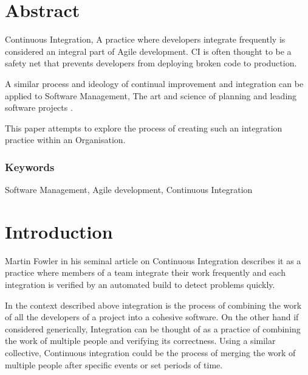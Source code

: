 \section*{Abstract}
Continuous Integration, A practice where developers integrate 
frequently \cite{stahl_modeling_2014} is considered an integral part of Agile 
development. CI is often thought to be a safety net that prevents developers from deploying broken code to production. 

A similar process and ideology of continual improvement and integration can be applied to Software Management, The art and science of planning and leading software projects \cite{stellman_applied_2005}.

This paper attempts to explore the process of creating such an integration practice within an Organisation.

\subsubsection*{Keywords}

Software Management, Agile development, Continuous Integration

\section*{Introduction}

Martin Fowler in his seminal article \cite{fowler_continuous_2006} on Continuous Integration describes it as a practice where members of a team integrate their work frequently and each integration is verified by an automated build to detect problems quickly.

In the context described above integration is the process of combining the work of all the developers of a project into a cohesive software. On the other hand if considered generically, Integration can be thought of as a practice of combining the work of multiple people and verifying its correctness. Using a similar collective, Continuous integration could be the process of merging the work of multiple people after specific events or set periods of time.
